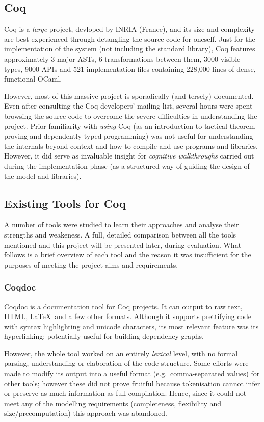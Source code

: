 \subsection{Coq}

Coq is a \emph{large} project, devloped by INRIA (France), and its size and
complexity are best experienced through detangling the source code for oneself.
Just for the implementation of the system (not including the standard library),
Coq features approximately 3 major ASTs, 6 transformations between them, 3000
visible types, 9000 APIs and 521 implementation files containing 228,000 lines
of dense, functional OCaml.

However, most of this massive project is sporadically (and tersely) documented.
Even after consulting the Coq developers' mailing-list, several hours were spent
browsing the source code to overcome the severe difficulties in understanding
the project. Prior familiarity with \emph{using} Coq (as an introduction
to tactical theorem-proving and dependently-typed programming) was not useful
for understanding the internals beyond context and how to compile and use
programs and libraries. However, it did serve as invaluable insight for
\emph{cognitive walkthroughs} carried out during the implementation phase
(as a structured way of guiding the design of the model and libraries).

\subsection{Existing Tools for Coq}
A number of tools were studied to learn their approaches and analyse their
strengths and weakeness. A full, detailed comparison between all the tools
mentioned and this project will be presented later, during evaluation.  What
follows is a brief overview of each tool and the reason it was insufficient for
the purposes of meeting the project aims and requirements.

\subsubsection{Coqdoc}
Coqdoc is a documentation tool for Coq projects. It can output to raw text,
HTML, \LaTeX~and a few other formats. Although it supports prettifying code with
syntax highlighting and unicode characters, its most relevant feature was its
hyperlinking: potentially useful for building dependency graphs.

However, the whole tool worked on an entirely \emph{lexical} level, with no
formal parsing, understanding or elaboration of the code structure. Some efforts
were made to modify its output into a useful format (e.g.\ comma-separated
values) for other tools; however these did not prove fruitful because
tokenisation cannot infer or preserve as much information as full compilation.
Hence, since it could not meet any of the modelling requirements (completeness,
flexibility and size/precomputation) this approach was abandoned.

